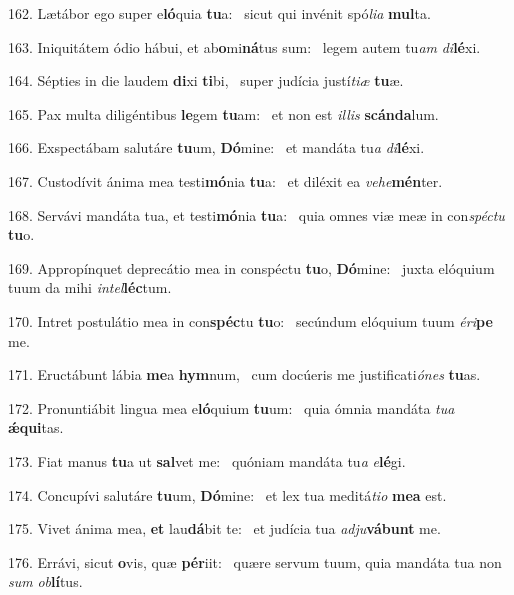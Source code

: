 162. Lætábor ego super e\textbf{ló}quia \textbf{tu}a: \ast\  sicut qui invénit spó\textit{li}\textit{a} \textbf{mul}ta.\

163. Iniquitátem ódio hábui, et ab\textbf{o}mi\textbf{ná}tus sum: \ast\  legem autem tu\textit{am} \textit{di}\textbf{lé}xi.\

164. Sépties in die laudem \textbf{di}xi \textbf{ti}bi, \ast\  super judícia justí\textit{ti}\textit{æ} \textbf{tu}æ.\

165. Pax multa diligéntibus \textbf{le}gem \textbf{tu}am: \ast\  et non est \textit{il}\textit{lis} \textbf{scán}\textbf{da}lum.\

166. Exspectábam salutáre \textbf{tu}um, \textbf{Dó}mine: \ast\  et mandáta tu\textit{a} \textit{di}\textbf{lé}xi.\

167. Custodívit ánima mea testi\textbf{mó}nia \textbf{tu}a: \ast\  et diléxit ea \textit{ve}\textit{he}\textbf{mén}ter.\

168. Servávi mandáta tua, et testi\textbf{mó}nia \textbf{tu}a: \ast\  quia omnes viæ meæ in con\textit{spéc}\textit{tu} \textbf{tu}o.\

169. Appropínquet deprecátio mea in conspéctu \textbf{tu}o, \textbf{Dó}mine: \ast\  juxta elóquium tuum da mihi \textit{in}\textit{tel}\textbf{léc}tum.\

170. Intret postulátio mea in con\textbf{spéc}tu \textbf{tu}o: \ast\  secúndum elóquium tuum \textit{é}\textit{ri}\textbf{pe} me.\

171. Eructábunt lábia \textbf{me}a \textbf{hym}num, \ast\  cum docúeris me justificati\textit{ó}\textit{nes} \textbf{tu}as.\

172. Pronuntiábit lingua mea e\textbf{ló}quium \textbf{tu}um: \ast\  quia ómnia mandáta \textit{tu}\textit{a} \textbf{ǽ}\textbf{qui}tas.\

173. Fiat manus \textbf{tu}a ut \textbf{sal}vet me: \ast\  quóniam mandáta tu\textit{a} \textit{e}\textbf{lé}gi.\

174. Concupívi salutáre \textbf{tu}um, \textbf{Dó}mine: \ast\  et lex tua meditá\textit{ti}\textit{o} \textbf{me}\textbf{a} est.\

175. Vivet ánima mea, \textbf{et} lau\textbf{dá}bit te: \ast\  et judícia tua \textit{ad}\textit{ju}\textbf{vá}\textbf{bunt} me.\

176. Errávi, sicut \textbf{o}vis, quæ \textbf{pér}iit: \ast\  quære servum tuum, quia mandáta tua non \textit{sum} \textit{ob}\textbf{lí}tus.\

